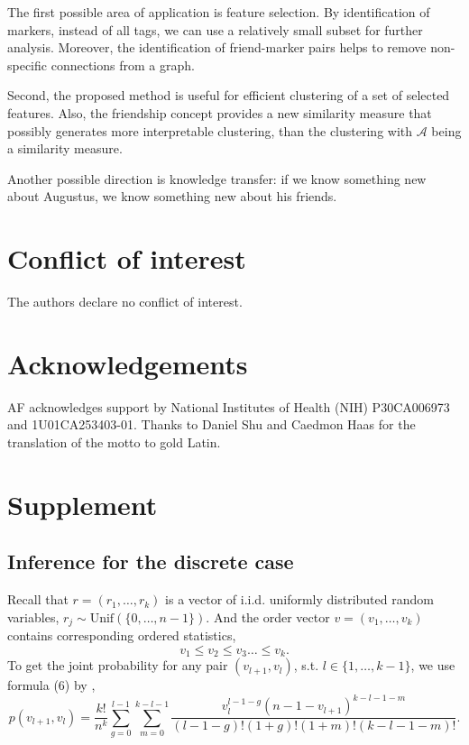 \documentclass{llncs}
\begin{document}
The first possible area of application is feature selection. By identification of markers, instead of all tags, we can use a relatively small subset for further analysis. Moreover, the identification of friend-marker pairs helps to remove non-specific connections from a graph. 

Second, the proposed method is useful for efficient clustering of a set of selected features. Also, the friendship concept provides a new similarity measure that possibly generates more interpretable clustering, than the clustering with $\mathcal{A}$ being a similarity measure.

Another possible direction is knowledge transfer: if we know something new about Augustus, we know something new about his friends. 




\section{Conflict of interest}
The authors declare no conflict of interest.

\section{Acknowledgements}
AF acknowledges support by National Institutes of Health (NIH) P30CA006973 and 1U01CA253403-01.
Thanks to Daniel Shu and Caedmon Haas for the translation of the motto to gold Latin. 





\newcommand{\beginsupplement}{%
        \setcounter{table}{0}
        \renewcommand{\thetable}{S\arabic{table}}%
        \setcounter{figure}{0}
        \renewcommand{\thefigure}{S\arabic{figure}}
        \setcounter{equation}{0}
        \renewcommand{\theequation}{S\arabic{equation}}%
     }

\newpage
\section*{Supplement}
\beginsupplement
\subsection{Inference for the discrete case} 
\label{appendix:discreet_case}
Recall that $r = (r_1, \dots, r_k)$ is a vector of i.i.d. uniformly distributed random variables, $r_j \sim \text{Unif}(\{0, \dots, n-1\})$. And the order vector $v = (v_1, \dots, v_k)$ contains corresponding ordered statistics,
\[
v_1 \leq v_2 \leq v_3 \dots \leq v_k.
\]
To get the joint probability for any pair $(v_{l+1}, v_l)$, s.t. $l\in\{1, \dots, k-1\}$, we use formula (6) by \cite{khatri1962distributions}, 
\begin{equation}
\label{eq:joint_distribution}
p(v_{l+1}, v_l) = \frac{k!}{n^k} 
\sum^{l-1}_{g=0}\sum^{k-l-1}_{m=0}
\frac{v^{l-1-g}_l (n-1 - v_{l+1})^{k-l-1-m}}{(l-1-g)!(1+g)!(1+m)!(k-l-1-m)!}.
\end{equation}
\end{document}
